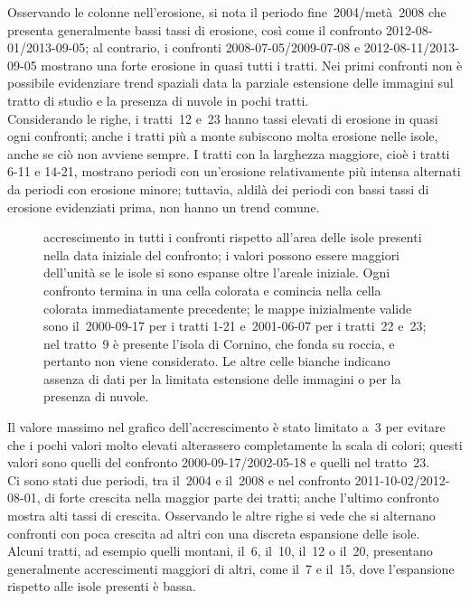 Osservando le colonne nell'erosione, si nota il periodo fine~2004/metà~2008 che presenta generalmente bassi tassi di erosione, così come il confronto 2012-08-01/2013-09-05;
al contrario, i confronti 2008-07-05/2009-07-08 e 2012-08-11/2013-09-05 mostrano una forte erosione in quasi tutti i tratti.
Nei primi confronti non è possibile evidenziare trend spaziali data la parziale estensione delle immagini sul tratto di studio e la presenza di nuvole in pochi tratti.
\\
Considerando le righe, i tratti~12 e~23 hanno tassi elevati di erosione in quasi ogni confronti; anche i tratti più a monte subiscono molta erosione nelle isole, anche se ciò non avviene sempre.
I tratti con la larghezza maggiore, cioè i tratti 6-11 e 14-21, mostrano periodi con un'erosione relativamente più intensa alternati da periodi con erosione minore; tuttavia, aldilà dei periodi con bassi tassi di erosione evidenziati prima, non hanno un trend comune.
%
\begin{figure}
	\centering
	
	\caption[accrescimento in tutti i confronti rispetto all'area delle isole presenti inizialmente]{accrescimento in tutti i confronti rispetto all'area delle isole presenti nella data iniziale del confronto; i valori possono essere maggiori dell'unità se le isole si sono espanse oltre l'areale iniziale.
	Ogni confronto termina in una cella colorata e comincia nella cella colorata immediatamente precedente; le mappe inizialmente valide sono il~2000-09-17 per i tratti 1-21 e~2001-06-07 per i tratti~22 e~23; nel tratto~9 è presente l'isola di Cornino, che fonda su roccia, e pertanto non viene considerato.
	Le altre celle bianche indicano assenza di dati per la limitata estensione delle immagini o per la presenza di nuvole.}
	\label{graph:accrescimento-matrix}
\end{figure}
%

Il valore massimo nel grafico dell'accrescimento è stato limitato a~\num{3} per evitare che i pochi valori molto elevati alterassero completamente la scala di colori; questi valori sono quelli del confronto 2000-09-17/2002-05-18 e quelli nel tratto~23.
\\
Ci sono stati due periodi, tra il~2004 e il~2008 e nel confronto 2011-10-02/2012-08-01, di forte crescita nella maggior parte dei tratti; anche l'ultimo confronto mostra alti tassi di crescita.
Osservando le altre righe si vede che si alternano confronti con poca crescita ad altri con una discreta espansione delle isole.
\\
Alcuni tratti, ad esempio quelli montani, il~6, il~10, il~12 o il~20, presentano generalmente accrescimenti maggiori di altri, come il~7 e il~15, dove l'espansione rispetto alle isole presenti è bassa.

